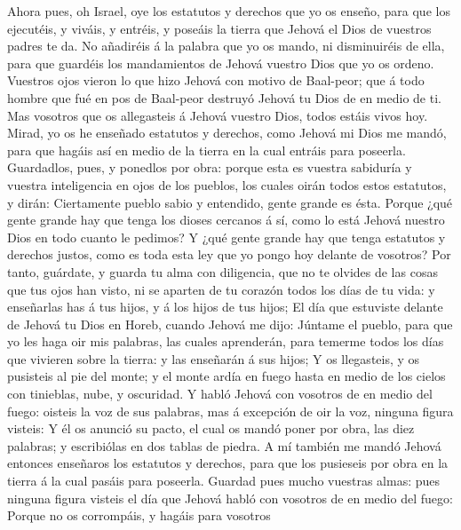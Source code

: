  Ahora pues, oh Israel, oye los estatutos y derechos que
yo os enseño, para que los ejecutéis, y viváis, y entréis, y poseáis la
tierra que Jehová el Dios de vuestros padres te da.  No
añadiréis á la palabra que yo os mando, ni disminuiréis de ella, para
que guardéis los mandamientos de Jehová vuestro Dios que yo os ordeno.
 Vuestros ojos vieron lo que hizo Jehová con motivo de
Baal-peor; que á todo hombre que fué en pos de Baal-peor destruyó Jehová
tu Dios de en medio de ti.  Mas vosotros que os
allegasteis á Jehová vuestro Dios, todos estáis vivos hoy.
 Mirad, yo os he enseñado estatutos y derechos, como
Jehová mi Dios me mandó, para que hagáis así en medio de la tierra en la
cual entráis para poseerla.  Guardadlos, pues, y ponedlos
por obra: porque esta es vuestra sabiduría y vuestra inteligencia en
ojos de los pueblos, los cuales oirán todos estos estatutos, y dirán:
Ciertamente pueblo sabio y entendido, gente grande es ésta.
 Porque ¿qué gente grande hay que tenga los dioses
cercanos á sí, como lo está Jehová nuestro Dios en todo cuanto le
pedimos?  Y ¿qué gente grande hay que tenga estatutos y
derechos justos, como es toda esta ley que yo pongo hoy delante de
vosotros?  Por tanto, guárdate, y guarda tu alma con
diligencia, que no te olvides de las cosas que tus ojos han visto, ni se
aparten de tu corazón todos los días de tu vida: y enseñarlas has á tus
hijos, y á los hijos de tus hijos;  El día que estuviste
delante de Jehová tu Dios en Horeb, cuando Jehová me dijo: Júntame el
pueblo, para que yo les haga oir mis palabras, las cuales aprenderán,
para temerme todos los días que vivieren sobre la tierra: y las
enseñarán á sus hijos;  Y os llegasteis, y os pusisteis
al pie del monte; y el monte ardía en fuego hasta en medio de los cielos
con tinieblas, nube, y oscuridad.  Y habló Jehová con
vosotros de en medio del fuego: oisteis la voz de sus palabras, mas á
excepción de oir la voz, ninguna figura visteis:  Y él os
anunció su pacto, el cual os mandó poner por obra, las diez palabras; y
escribiólas en dos tablas de piedra.  A mí también me
mandó Jehová entonces enseñaros los estatutos y derechos, para que los
pusieseis por obra en la tierra á la cual pasáis para poseerla.
 Guardad pues mucho vuestras almas: pues ninguna figura
visteis el día que Jehová habló con vosotros de en medio del fuego:
 Porque no os corrompáis, y hagáis para vosotros
